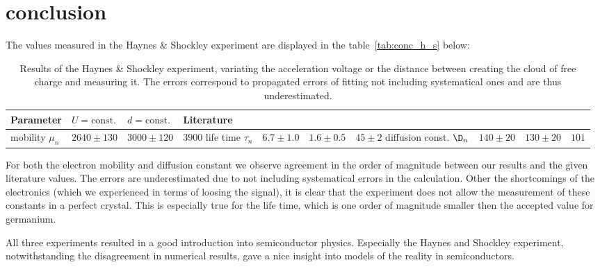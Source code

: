 \section{conclusion}



The values measured in the Haynes \& Shockley experiment 
are displayed in the table~\ref{tab:conc_h_s} below:
\renewcommand{\arraystretch}{1.5}
\begin{table}[htdp]
    \centering
    \caption{
        Results of the Haynes \& Shockley experiment, variating the 
        acceleration voltage or the distance between creating the 
        cloud of free charge and measuring it. The errors correspond 
        to propagated errors of fitting not including systematical ones 
        and are thus underestimated. 
        }
	\begin{tabular}{|p{4cm}|p{3cm}|p{3cm}|p{3cm}|}
		\hline
		\rowcolor{tabcolor}
		Parameter           & $U = \text{const.}$   & $d = \text{const.}$   & Literature~\cite{staatsexamen}
     	\\ \hline
        mobility $\mu_n$    & $2640 \pm 130$        & $3000 \pm 120$        & $3900$
        life time $\tau_n$  & $6.7 \pm 1.0$         & $1.6 \pm 0.5$         & $45 \pm 2$
        diffusion const. $\D_n$& $140 \pm 20$       & $130 \pm 20$          & $101$
		\hline
	\end{tabular}
    \label{tab:h_s_fit_parameters}
\end{table}
For both the electron mobility and diffusion constant we observe agreement in the 
order of magnitude between our results and the given literature values. The 
errors are underestimated due to not including systematical errors in the calculation. 
Other the shortcomings of the electronics (which we experienced in terms 
of loosing the signal), it is clear that the experiment does not allow the 
measurement of these constants in a perfect crystal. This is especially 
true for the life time, which is one order of magnitude smaller then the 
accepted value for germanium. 


All three experiments resulted in a good introduction into semiconductor physics. 
Especially the Haynes and Shockley experiment, notwithstanding the disagreement in 
numerical results, gave a nice insight into models of the reality in semiconductors. 

